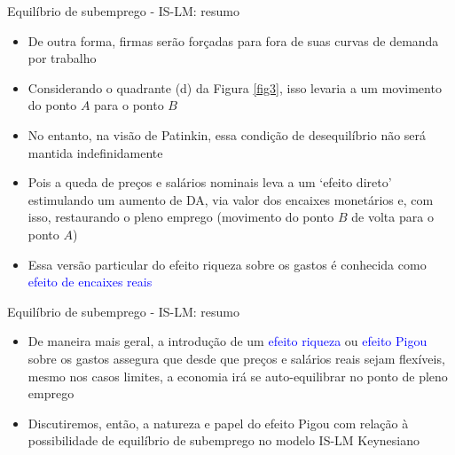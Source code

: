 \documentclass[10pt]{beamer}
\begin{document}
\begin{frame}{Equilíbrio de subemprego - IS-LM: resumo}
    \begin{itemize}
        \item De outra forma, firmas serão forçadas para fora de suas curvas de demanda por trabalho
        \bigskip
        \item Considerando o quadrante (d) da Figura \ref{fig3}, isso levaria a um movimento do ponto $A$ para o ponto $B$
        \bigskip
        \item No entanto, na visão de Patinkin, essa condição de desequilíbrio não será mantida indefinidamente
        \bigskip
        \item Pois a queda de preços e salários nominais leva a um `efeito direto' estimulando um aumento de DA, via valor dos encaixes monetários e, com isso, restaurando o pleno emprego (movimento do ponto $B$ de volta para o ponto $A$)
        \bigskip
        \item Essa versão particular do efeito riqueza sobre os gastos é conhecida como \textcolor{blue}{efeito de encaixes reais}
    \end{itemize}
\end{frame}

\begin{frame}{Equilíbrio de subemprego - IS-LM: resumo}
    \begin{itemize}
        \item De maneira mais geral, a introdução de um \textcolor{blue}{efeito riqueza} ou \textcolor{blue}{efeito Pigou} sobre os gastos assegura que desde que preços e salários reais sejam flexíveis, mesmo nos casos limites, a economia irá se auto-equilibrar no ponto de pleno emprego
        \bigskip
        \item Discutiremos, então, a natureza e papel do efeito Pigou com relação à possibilidade de equilíbrio de subemprego no modelo IS-LM Keynesiano
    \end{itemize}
\end{frame}
\end{document}
